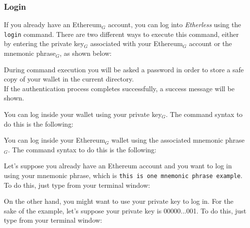 \subsubsection{Login}
If you already have an Ethereum$_{G}$ account, you can log into \textit{Etherless} using the \texttt{login} command. There are two different ways to execute this command, either by entering the private key$_{G}$ associated with your Ethereum$_{G}$ account or the mnemonic phrase$_{G}$, as shown below: \\
\begin{center}
\end{center}
During command execution you will be asked a password in order to store a safe copy of your wallet in the current directory. \\
If the authentication process completes successfully, a success message will be shown.

You can log inside your wallet using your private key$_{G}$. The command syntax to do this is the following:
\begin{center}
\end{center}

You can log inside your Ethereum$_{G}$ wallet using the associated mnemonic phrase$_{G}$. The command syntax to do this is the following:
\begin{center}
\end{center}

Let's suppose you already have an Ethereum account and you want to log in using your mnemonic phrase, which is \texttt{this is one mnemonic phrase example}. To do this, just type from your terminal window:
\begin{center}
\end{center}

On the other hand, you might want to use your private key to log in. For the sake of the example,  let's suppose your private key is 00000...001. To do this, just type from your terminal window:
\begin{center}
\end{center}

